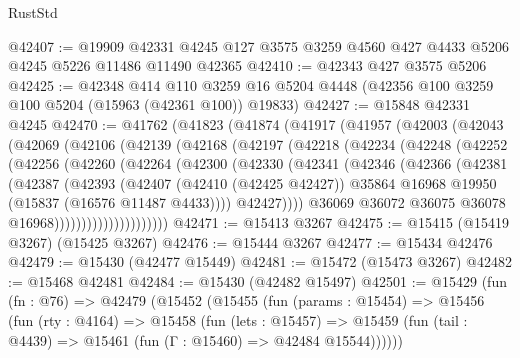 \begin{lexlean}{RustStd}
\begin{coremodule}
{\begin{coremodule}
{{{{{{{{{{{{{{{{{{{{{{{{{{{{{{{{{{{{{{{{{{{{{{{{{{{{{{{{{{{{@42407 := @19909
    @42331
    @4245
    @127
    @3575
    @3259
    @4560
    @427
    @4433
    @5206
    @4245
    @5226
    @11486
    @11490
    @42365
@42410 := @42343 @427 @3575 @5206
@42425 := @42348
    @414
    @110
    @3259
    @16
    @5204
    @4448
    (@42356 @100 @3259 @100 @5204 (@15963 (@42361 @100)) @19833)
@42427 := @15848 @42331 @4245
@42470 := @41762
    (@41823
      (@41874
        (@41917
          (@41957
            (@42003
              (@42043
                (@42069
                  (@42106
                    (@42139
                      (@42168
                        (@42197
                          (@42218
                            (@42234
                              (@42248
                                (@42252
                                  (@42256
                                    (@42260
                                      (@42264
                                        (@42300
                                          (@42330
                                            (@42341
                                              (@42346
                                                (@42366
                                                  (@42381
                                                    (@42387
                                                      (@42393
                                                        (@42407
                                                          (@42410 (@42425 @42427))
                                                          @35864
                                                          @16968
                                                          @19950
                                                          (@15837 (@16576 @11487 @4433))))
                                                      @42427))))
                                              @36069
                                              @36072
                                              @36075
                                              @36078
                                              @16968)))))))))))))))))))))
@42471 := @15413 @3267
@42475 := @15415 (@15419 @3267) (@15425 @3267)
@42476 := @15444 @3267
@42477 := @15434 @42476
@42479 := @15430 (@42477 @15449)
@42481 := @15472 (@15473 @3267)
@42482 := @15468 @42481
@42484 := @15430 (@42482 @15497)
@42501 := @15429
    (fun (fn : @76) =>
    @42479
      (@15452
        (@15455
          (fun (params : @15454) =>
          @15456
            (fun (rty : @4164) =>
            @15458
              (fun (lets : @15457) =>
              @15459 (fun (tail : @4439) => @15461 (fun (Γ : @15460) => @42484 @15544))))))
}}}}}}}}}}}}}}}}}}}}}}}}}}}}}}}}}}}}}}}}}}}}}}}}}}}}}}}}}}}}
\end{coremodule}}
\end{coremodule}
\end{lexlean}
